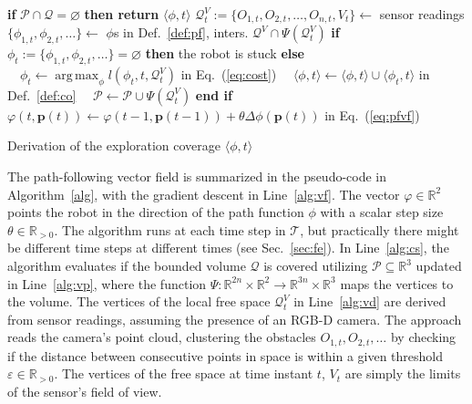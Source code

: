 \documentclass[letterpaper,10pt,conference,twoside]{IEEEtran}
\theoremstyle{definition}
\DeclareMathOperator*{\argmax}{arg\,max}
\begin{document}
\begin{algorithm}[t]
  \begin{algorithmic}[1]
    \small
      \STATE \textbf{if} $\mathcal{P}\cap\mathcal{Q}=\varnothing$ \textbf{then return }$\langle\phi,t\rangle$\vspace*{.3ex}\label{alg:cs}
      \STATE $\mathcal{Q}^V_t:=\{O_{1,t},O_{2,t},\dots,O_{n,t},V_t\}\gets$ sensor readings\label{alg:vd}\vspace*{.3ex}
      \vspace*{.3ex}
        \STATE $\{\phi_{1,t},\phi_{2,t},\dots\}\gets$ $\phi$s in Def.~\ref{def:pf}, inters. $\mathcal{Q}^V\cap \Psi(\mathcal{Q}^V_t)$\vspace*{-1.6ex}
        \STATE \textbf{if} $\phi_t:=\{\phi_{1,t},\phi_{2,t},\dots\}=\varnothing$ \textbf{then }the robot is stuck\label{alg:mpty}\vspace*{.3ex}
        \STATE \textbf{else}
        \STATE $\,\,\,\,\,\,\phi_t\gets \argmax_{\phi}l(\phi_t,t,\mathcal{Q}_t^V)$ in Eq.~(\ref{eq:cost})\label{alg:am}\vspace*{.3ex}
        \STATE $\,\,\,\,\,\,\langle\phi,t\rangle\gets\langle\phi,t\rangle\cup\langle\phi_t,t\rangle$ in Def.~\ref{def:co}\vspace*{.3ex}
        \STATE $\,\,\,\,\,\,\mathcal{P}\gets\mathcal{P}\cup \Psi(\mathcal{Q}_t^V)$\label{alg:vp}
        \STATE \textbf{end if}
        \vspace*{.3ex}
      \ENDIF
      \STATE $\varphi(t,\mathbf{p}(t))\gets\varphi(t-1,\mathbf{p}(t-1))+\theta\Delta\phi(\mathbf{p}(t))$ in Eq.~(\ref{eq:pfvf})\vspace*{.3ex}\label{alg:vf}
    \ENDFOR
  \end{algorithmic}
  \caption{Derivation of the exploration coverage $\langle\phi,t\rangle$}\label{alg}
\end{algorithm}

The path-following vector field is summarized in the pseudo-code in Algorithm~\ref{alg}, with the gradient descent in Line~\ref{alg:vf}. The vector $\varphi\in\mathbb{R}^2$ points the robot in the direction of the path function $\phi$ with a scalar step size $\theta\in\mathbb{R}_{>0}$. The algorithm runs at each time step in $\mathcal{T}$, %
but practically there might be different time steps at different times (see Sec.~\ref{sec:fe}). 
In Line~\ref{alg:cs}, the algorithm evaluates if the bounded volume $\mathcal{Q}$ is covered utilizing $\mathcal{P}\subseteq\mathbb{R}^3$ updated in Line~\ref{alg:vp}, where the function $\Psi:\mathbb{R}^{2n}\times\mathbb{R}^2\rightarrow\mathbb{R}^{3n}\times\mathbb{R}^3$ maps the vertices to the volume. The vertices of the local free space $\mathcal{Q}^V_t$ in Line~\ref{alg:vd} are derived from sensor readings, assuming the presence of an RGB-D camera. The %
approach reads the camera's point cloud, clustering the obstacles $O_{1,t},O_{2,t},\dots$ by checking if the distance between consecutive points in space is within a given threshold $\varepsilon\in\mathbb{R}_{>0}$. The vertices of the free space at time instant $t$, $V_t$ are simply the limits of the sensor's field of view.
\end{document}
